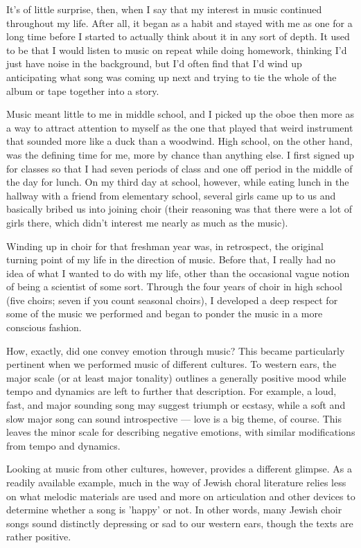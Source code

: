 \documentclass{book}
\begin{document}
It's of little surprise, then, when I say that my interest in music continued throughout my life.  After all, it began as a habit and stayed with me as one for a long time before I started to actually think about it in any sort of depth.  It used to be that I would listen to music on repeat while doing homework, thinking I'd just have noise in the background, but I'd often find that I'd wind up anticipating what song was coming up next and trying to tie the whole of the album or tape together into a story.

Music meant little to me in middle school, and I picked up the oboe then more as a way to attract attention to myself as the one that played that weird instrument that sounded more like a duck than a woodwind.  High school, on the other hand, was the defining time for me, more by chance than anything else.  I first signed up for classes so that I had seven periods of class and one off period in the middle of the day for lunch.  On my third day at school, however, while eating lunch in the hallway with a friend from elementary school, several girls came up to us and basically bribed us into joining choir (their reasoning was that there were a lot of girls there, which didn't interest me nearly as much as the music).

Winding up in choir for that freshman year was, in retrospect, the original turning point of my life in the direction of music.  Before that, I really had no idea of what I wanted to do with my life, other than the occasional vague notion of being a scientist of some sort.  Through the four years of choir in high school (five choirs; seven if you count seasonal choirs), I developed a deep respect for some of the music we performed and began to ponder the music in a more conscious fashion.

How, exactly, did one convey emotion through music? This became particularly pertinent when we performed music of different cultures.  To western ears, the major scale (or at least major tonality) outlines a generally positive mood while tempo and dynamics are left to further that description.  For example, a loud, fast, and major sounding song may suggest triumph or ecstasy, while a soft and slow major song can sound introspective --- love is a big theme, of course.  This leaves the minor scale for describing negative emotions, with similar modifications from tempo and dynamics.

Looking at music from other cultures, however, provides a different glimpse.  As a readily available example, much in the way of Jewish choral literature relies less on what melodic materials are used and more on articulation and other devices to determine whether a song is 'happy' or not.  In other words, many Jewish choir songs sound distinctly depressing or sad to our western ears, though the texts are rather positive.
\end{document}
